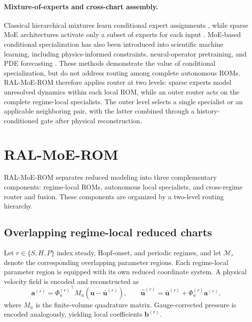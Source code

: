 \documentclass{article}
\begin{document}
\paragraph{Mixture-of-experts and cross-chart assembly.}
Classical hierarchical mixtures learn conditional expert assignments \citep{jacobs1991,jordan1994}, while sparse MoE architectures activate only a subset of experts for each input \citep{shazeer2017,fedus2022}. MoE-based conditional specialization has also been introduced into scientific machine learning, including physics-informed constraints, 
neural-operator pretraining, and PDE forecasting
\citep{ICLR2024_9aeda582,NEURIPS2024_b83fae17,
NEURIPS2025_2d23a999,ICLR2026_754612bd}. These methods demonstrate the value of conditional specialization, but do
not address routing among complete autonomous ROMs. RAL-MoE-ROM therefore applies router  at two levels: sparse experts model unresolved dynamics within each local ROM, while an outer router acts on the complete regime-local specialists. The outer level selects a single specialist or an
applicable neighboring pair, with the latter combined through a history-conditioned gate after physical reconstruction.



\section{RAL-MoE-ROM}
\label{sec:method}

RAL-MoE-ROM separates reduced modeling into three complementary components: regime-local ROMs, autonomous local specialists, and cross-regime router and fusion. These components are organized by a two-level routing hierarchy. 

\subsection{Overlapping regime-local reduced charts}

Let $r\in\{S,H,P\}$ index steady, Hopf-onset, and periodic regimes, and let $\mathcal M_r$ denote the corresponding overlapping parameter regions. Each regime-local parameter region is equipped with its own reduced coordinate system. A physical velocity field is encoded and reconstructed as
\begin{equation}
  \bm a^{(r)}={\Phi_u^{(r)}}^{\top}M_u(\bm u-\bar{\bm u}^{(r)}),\qquad
  \widehat{\bm u}^{(r)}=\bar{\bm u}^{(r)}+\Phi_u^{(r)}\bm a^{(r)},
  \label{eq:main_chart}
\end{equation}
where $M_u$ is the finite-volume quadrature matrix. Gauge-corrected pressure is encoded analogously, yielding local coefficients
$\bm b^{(r)}$. 
\end{document}
